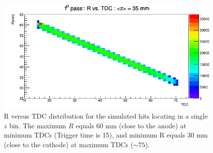 \documentclass[aps,prl,twocolumn,showpacs,superscriptaddress,groupedaddress]{revtex4}
\begin{document}
\begin{figure}[tb]
\centering
\includegraphics[scale=0.37]{fig/R_correlation.png}
\caption[]{\small\sf R versus TDC distribution for the simulated hits locating in a single $z$ bin. The maximum $R$ equals 60 mm (close to the anode) at minimum TDCs (Trigger time is 15), and minimum R equals 30 mm (close to the cathode) at maximum TDCs ($\sim75$).}
\label{fig:R_correlation}
\end{figure} 
\end{document}
